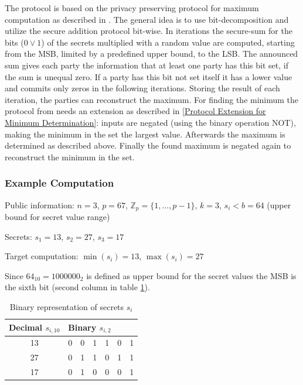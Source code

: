 		The protocol is based on the privacy preserving protocol for maximum computation as described in \textcite{Hasan2013}. The general idea is to use bit-decomposition and utilize the secure addition protocol bit-wise. In iterations the secure-sum for the bits ($0 \lor 1$) of the secrets multiplied with a random value are computed, starting from the \gls{MSB}, limited by a predefined upper bound, to the \gls{LSB}. The announced sum gives each party the information that at least one party has this bit set, if the sum is unequal zero. If a party has this bit not set itself it has a lower value and commits only zeros in the following iterations. Storing the result of each iteration, the parties can reconstruct the maximum.
		For finding the minimum the protocol from \textcite{Hasan2013} needs an extension as described in \ref{Protocol Extension for Minimum Determination}: inputs are negated (using the binary operation NOT), making the minimum in the set the largest value. Afterwards the maximum is determined as described above. Finally the found maximum is negated again to reconstruct the minimum in the set.
		
		\subsubsection{Example Computation} \label{Secure Comparison Example}
		
		Public information: $n=3$, $p=67$, $\mathbb{Z}_p=\{1,...,p-1\}$, $k=3$, $s_i<b=64$ (upper bound for secret value range) \par
		\noindent Secrets: $s_1=13$, $s_2=27$, $s_3=17$ \par
		
		\noindent Target computation: $\min(s_i)=13$, $\max(s_i)=27$
		
		Since $64_{10}=1000000_2$ is defined as upper bound for the secret values the \gls{MSB} is the sixth bit (second column in table \ref{table:secure maximum binary representation of secrets}).
		 
		\begin{table}[!htb]
			\centering
			\caption{Binary representation of secrets $s_i$} \label{table:secure maximum binary representation of secrets}
			\begin{tabular}{|c|l|l|l|l|l|l|}
				\hline
				Decimal $s_{i,10}$ & \multicolumn{6}{l|}{Binary $s_{i,2}$} \\ \hline
				13                 & 0    & 0    & 1    & 1    & 0   & 1   \\ \hline
				27                 & 0    & 1    & 1    & 0    & 1   & 1   \\ \hline
				17                 & 0    & 1    & 0    & 0    & 0   & 1   \\ \hline
			\end{tabular}
		\end{table}

